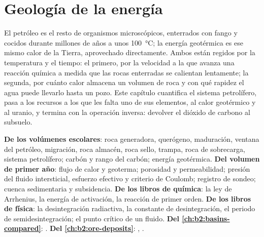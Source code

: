 \chapter{Geología de la energía}\label{ch:b2:energy-geology}

El petróleo es el resto de organismos microscópicos, enterrados con fango y cocidos durante millones de años a
unos \qty{100}{\celsius}; la energía geotérmica es ese mismo calor de la Tierra, aprovechado directamente.
Ambos están regidos por la temperatura y el tiempo: el primero, por la velocidad a la que avanza una reacción química a medida que
las rocas enterradas se calientan lentamente; la segunda, por cuánto calor almacena un volumen de roca y con qué rapidez el agua
puede llevarlo hasta un pozo. Este capítulo cuantifica el sistema petrolífero, pasa a los recursos a los que
les falta uno de sus elementos, al calor geotérmico y al uranio, y termina con la operación inversa:
devolver el dióxido de carbono al subsuelo.

\begin{recall}
\textbf{De los volúmenes escolares}: roca generadora, querógeno, maduración, ventana del petróleo, migración,
roca almacén, roca sello, trampa, roca de sobrecarga, sistema petrolífero; carbón y rango del carbón; energía geotérmica.
\textbf{Del volumen de primer año}: flujo de calor y geoterma; porosidad y permeabilidad; presión del fluido
intersticial, esfuerzo efectivo y criterio de Coulomb; registro de sondeo; cuenca sedimentaria y
subsidencia. \textbf{De los libros de química}: la ley de Arrhenius, la energía de activación, la reacción de primer
orden. \textbf{De los libros de física}: la desintegración radiactiva, la constante de desintegración, el periodo de semidesintegración; el
punto crítico de un fluido. \textbf{Del \cref{ch:b2:basins-compared}}: .
\textbf{Del \cref{ch:b2:ore-deposits}}: , .
\end{recall}

